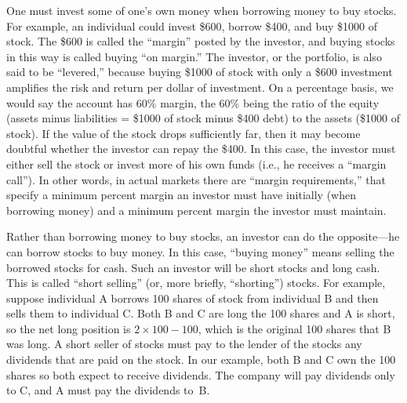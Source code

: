 One must invest some of one's own money when borrowing money to buy stocks.  For example, an individual could invest \$600, borrow \$400, and buy \$1000 of stock.  The \$600 is called the ``margin''  posted by the investor, and buying stocks in this way is called buying ``on margin.''  The investor, or the portfolio, is also said to be ``levered,'' because buying \$1000 of stock with only a \$600 investment amplifies the risk and return per dollar of investment.   On a percentage basis, we would say the account has 60\% margin, the 60\% being the ratio of the equity (assets minus liabilities = \$1000 of stock minus \$400 debt) to the assets (\$1000 of stock).   If the value of the stock drops sufficiently far, then it may become doubtful whether the investor can repay the \$400.  In this case, the investor must either sell the stock or invest more of his own funds (i.e., he receives a ``margin call'').   In other words, in actual markets there are ``margin requirements,''  that specify a minimum percent margin an investor must have initially (when borrowing money) and a minimum percent margin the investor must maintain.  

Rather than borrowing money to buy stocks, an investor can do the opposite---he can borrow stocks to buy money.  In this case, ``buying money'' means selling the borrowed stocks for cash.  Such an investor will be short stocks and long cash.  This is called ``short selling'' (or, more briefly, ``shorting'') stocks.   For example, suppose individual A borrows 100 shares of stock from individual B and then sells them to individual C.  Both B and C are long the 100 shares and A is short, so the net long position is $2 \times 100 - 100$, which is the original 100 shares that B was long.  A short seller of stocks must pay to the lender of the stocks any dividends that are paid on the stock.  In our example, both B and C own the 100 shares so both expect to receive dividends.  The company will pay dividends only to C, and A must pay the dividends to~B.


